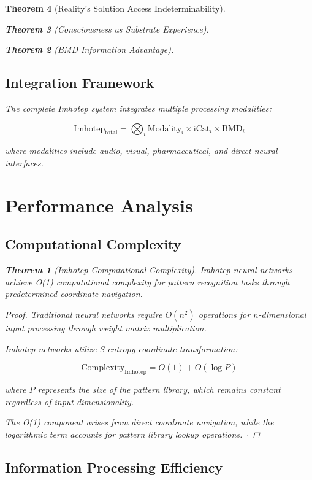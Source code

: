\documentclass[12pt,a4paper]{article}
\newtheorem{theorem}{Theorem}[section]
\theoremstyle{remark}
\begin{document}
\begin{theorem}[Reality's Solution Access Indeterminability]
\begin{theorem}[Consciousness as Substrate Experience]
\begin{theorem}[BMD Information Advantage]
{{{\subsection{Integration Framework}

The complete Imhotep system integrates multiple processing modalities:

\begin{equation}
\text{Imhotep}_{\text{total}} = \bigotimes_{i} \text{Modality}_i \times \text{iCat}_i \times \text{BMD}_i
\end{equation}

where modalities include audio, visual, pharmaceutical, and direct neural interfaces.

\section{Performance Analysis}

\subsection{Computational Complexity}

\begin{theorem}[Imhotep Computational Complexity]
Imhotep neural networks achieve O(1) computational complexity for pattern recognition tasks through predetermined coordinate navigation.
\end{theorem}

\begin{proof}
Traditional neural networks require $O(n^2)$ operations for $n$-dimensional input processing through weight matrix multiplication.

Imhotep networks utilize S-entropy coordinate transformation:

\begin{equation}
\text{Complexity}_{\text{Imhotep}} = O(1) + O(\log P)
\end{equation}

where $P$ represents the size of the pattern library, which remains constant regardless of input dimensionality.

The O(1) component arises from direct coordinate navigation, while the logarithmic term accounts for pattern library lookup operations. $\square$
\end{proof}

\subsection{Information Processing Efficiency}

}}}
\end{theorem}
\end{theorem}
\end{theorem}
\end{document}
